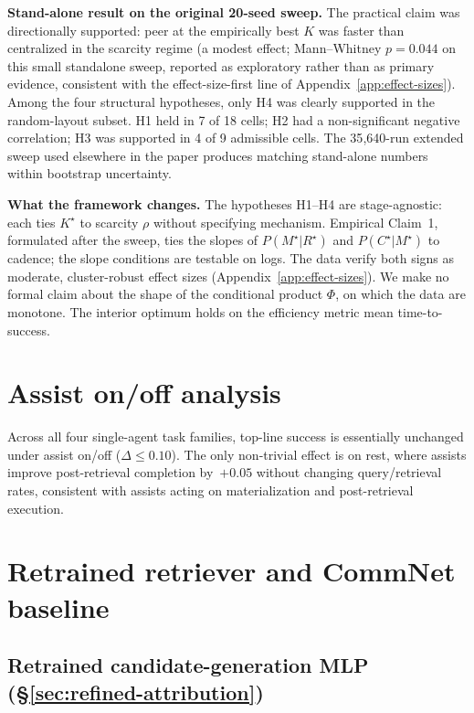 \documentclass{article}
\begin{document}
\textbf{Stand-alone result on the original 20-seed sweep.}
The practical claim was directionally supported: peer at the empirically best $K$ was faster than centralized in the scarcity regime (a modest effect; Mann--Whitney $p{=}0.044$ on this small standalone sweep, reported as exploratory rather than as primary evidence, consistent with the effect-size-first line of Appendix~\ref{app:effect-sizes}). Among the four structural hypotheses, only H4 was clearly supported in the random-layout subset. H1 held in 7 of 18 cells; H2 had a non-significant negative correlation; H3 was supported in 4 of 9 admissible cells. The 35{,}640-run extended sweep used elsewhere in the paper produces matching stand-alone numbers within bootstrap uncertainty.

\textbf{What the framework changes.}
The hypotheses H1--H4 are stage-agnostic: each ties $K^\star$ to scarcity $\rho$ without specifying mechanism. Empirical Claim~1, formulated after the sweep, ties the slopes of $P(M^\star|R^\star)$ and $P(C^\star|M^\star)$ to cadence; the slope conditions are testable on logs. The data verify both signs as moderate, cluster-robust effect sizes (Appendix~\ref{app:effect-sizes}). We make no formal claim about the shape of the conditional product $\Phi$, on which the data are monotone. The interior optimum holds on the efficiency metric mean time-to-success.

\section{Assist on/off analysis}
\label{app:assist}

Across all four single-agent task families, top-line success is essentially unchanged under assist on/off ($\Delta \le 0.10$). The only non-trivial effect is on rest, where assists improve post-retrieval completion by~$+0.05$ without changing query/retrieval rates, consistent with assists acting on materialization and post-retrieval execution.

\section{Retrained retriever and CommNet baseline}
\label{app:learned-baselines}

\subsection{Retrained candidate-generation MLP (\S\ref{sec:refined-attribution})}
\end{document}
